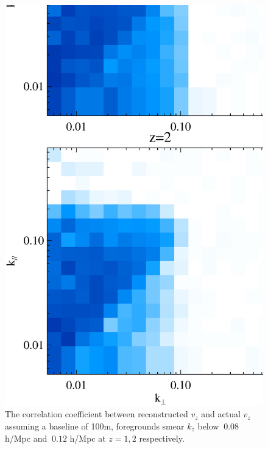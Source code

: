 \begin{figure}
\begin{minipage}[t]{0.3\linewidth}
{}
\label{fig:k3v}
\end{minipage}
\begin{minipage}[t]{0.3\linewidth}
\begin{center}
\includegraphics[width=\textwidth,height=1.7\textwidth]{figure/powv2d_z1z2_r15r10.eps}
\end{center}
\vspace{-0.7cm}
\caption{The correlation coefficient between reconstructed $v_z$  and actual $v_z$ 
assuming a baseline of 100m, foregrounds 
    smear $k_z$ below $~0.08$ h/Mpc and $~0.12$ h/Mpc 
    at $z=1,2$ respectively. }

\end{minipage}
\end{figure}
